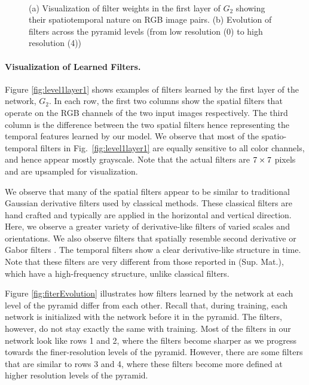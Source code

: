\documentclass[10pt,twocolumn,letterpaper]{article}
\begin{document}
\begin{figure}[t]
\begin{center}
~
\end{center}     %
\vspace{-0.1in}
\caption{(a) Visualization of filter weights in the first layer of $G_2$ showing their spatiotemporal nature on RGB image pairs. (b) Evolution of filters across the pyramid levels (from low resolution (0) to high resolution (4))}
\end{figure}
\paragraph{Visualization of Learned Filters.}
 Figure \ref{fig:level1layer1} shows examples of  filters learned by the first layer of the network, $G_2$. 
In each row, the first two columns show the spatial filters that operate on the RGB channels of the two input images respectively. 
The third column is the difference between the two spatial filters hence representing the temporal features learned by our model. 
We observe that most of the spatio-temporal filters in Fig.~\ref{fig:level1layer1} are equally sensitive to all color channels, and hence appear mostly grayscale.
Note that the actual filters are $7\times\/ 7$ pixels and are upsampled for visualization.
 
We observe that many of the spatial filters appear to be similar to traditional Gaussian derivative filters used by classical methods.
These classical filters are hand crafted and typically are applied in the horizontal and vertical direction.
Here, we observe a greater variety of derivative-like filters of varied scales and orientations.
We also observe filters that spatially resemble second derivative or Gabor filters \cite{adelson1985spatiotemporal}.
The temporal filters show a clear derivative-like structure in time.
Note that these filters are very different from those reported in \cite{dosovitskiy2015flownet} (Sup. Mat.), which have a high-frequency structure, unlike classical filters. 

Figure \ref{fig:fiterEvolution} illustrates how filters learned by the network at each level of the pyramid differ from each other. 
Recall that, during training, each network is initialized with the network before it in the pyramid.
The filters, however, do not stay exactly the same with training.
Most of the filters in our network look like rows 1 and 2, where the filters become sharper as we progress towards the finer-resolution levels of the pyramid. 
However, there are some filters that are similar to rows 3 and 4, where these filters become more defined at higher resolution levels of the pyramid. 
\end{document}
